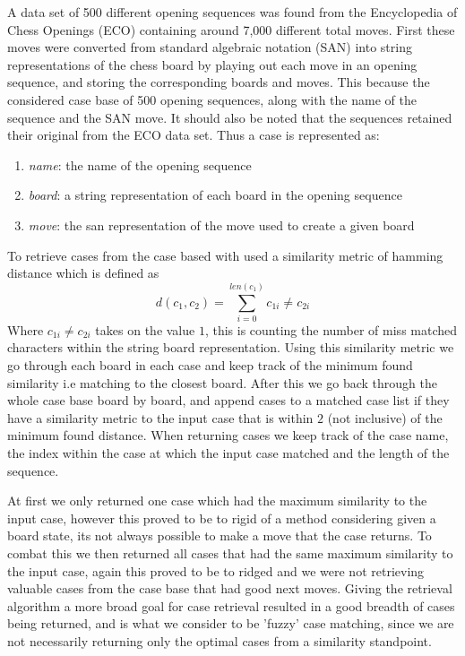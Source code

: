 \documentclass[letterpaper]{article}
\begin{document}
A data set of 500 different opening sequences was found from the Encyclopedia of Chess Openings (ECO) containing around 7,000 different total moves. First these moves were converted from standard algebraic notation (SAN) into string representations of the chess board by playing out each move in an opening sequence, and storing the corresponding boards and moves. This because the considered case base of 500 opening sequences, along with the name of the sequence and the SAN move. It should also be noted that the sequences retained their original from the ECO data set. Thus a case is represented as:
\begin{enumerate}[i]
    \item \textit{name}: the name of the opening sequence
    \item \textit{board}: a string representation of each board in the opening sequence
    \item \textit{move}: the san representation of the move used to create a given board
\end{enumerate}
To retrieve cases from the case based with used a similarity metric of hamming distance which is defined as
$$
d(c_1,c_2) = \sum_{i=0}^{len(c_1)} c_{1i} \neq c_{2i}
$$
Where $c_{1i} \neq c_{2i}$ takes on the value $1$, this is counting the number of miss matched characters within the string board representation. Using this similarity metric we go through each board in each case and keep track of the minimum found similarity i.e matching to the closest board. After this we go back through the whole case base board by board, and append cases to a matched case list if they have a similarity metric to the input case that is within $2$ (not inclusive) of the minimum found distance. When returning cases we keep track of the case name, the index within the case at which the input case matched and the length of the sequence.

At first we only returned one case which had the maximum similarity to the input case, however this proved to be to rigid of a method considering given a board state, its not always possible to make a move that the case returns. To combat this we then returned all cases that had the same maximum similarity to the input case, again this proved to be to ridged and we were not retrieving valuable cases from the case base that had good next moves. Giving the retrieval algorithm a more broad goal for case retrieval resulted in a good breadth of cases being returned, and is what we consider to be 'fuzzy' case matching, since we are not necessarily returning only the optimal cases from a similarity standpoint. 
\end{document}
